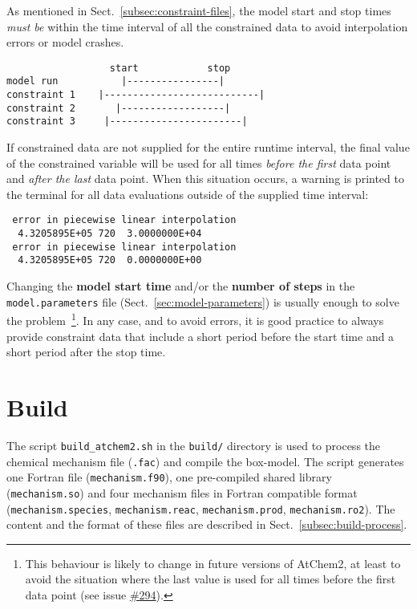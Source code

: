 As mentioned in Sect.~\ref{subsec:constraint-files}, the model start
and stop times \emph{must be} within the time interval of all the
constrained data to avoid interpolation errors or model crashes.

\begin{verbatim}
                  start            stop
model run           |----------------|
constraint 1    |---------------------------|
constraint 2       |------------------|
constraint 3     |-----------------------|
\end{verbatim}

If constrained data are not supplied for the entire runtime interval,
the final value of the constrained variable will be used for all times
\emph{before the first} data point and \emph{after the last} data
point. When this situation occurs, a warning is printed to the
terminal for all data evaluations outside of the supplied time
interval:

\begin{verbatim}
 error in piecewise linear interpolation
  4.3205895E+05 720  3.0000000E+04
 error in piecewise linear interpolation
  4.3205895E+05 720  0.0000000E+00
\end{verbatim}

Changing the \textbf{model start time} and/or the \textbf{number of steps}
in the \texttt{model.parameters} file (Sect.~\ref{sec:model-parameters})
is usually enough to solve the problem~\footnote{This behaviour is
  likely to change in future versions of AtChem2, at least to avoid
  the situation where the last value is used for all times before the
  first data point (see issue
  \href{https://github.com/AtChem/AtChem2/issues/294}{\#294}).}.
In any case, and to avoid errors, it is good practice to always
provide constraint data that include a short period before the start
time and a short period after the stop time.

\section{Build} \label{sec:build}

The script \texttt{build\_atchem2.sh} in the \texttt{build/} directory
is used to process the chemical mechanism file (\texttt{.fac}) and
compile the box-model. The script generates one Fortran file
(\texttt{mechanism.f90}), one pre-compiled shared library
(\texttt{mechanism.so}) and four mechanism files in Fortran compatible
format (\texttt{mechanism.species}, \texttt{mechanism.reac},
\texttt{mechanism.prod}, \texttt{mechanism.ro2}). The content and the
format of these files are described in Sect.~\ref{subsec:build-process}.

